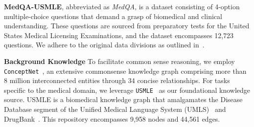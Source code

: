 \documentclass{article}
\theoremstyle{boldremark}
\begin{document}
\noindent \textbf{MedQA-USMLE}, abbreviated as \textit{MedQA}, is a dataset consisting of 4-option multiple-choice questions that demand a grasp of biomedical and clinical understanding. These questions are sourced from preparatory tests for the United States Medical Licensing Examinations, and the dataset encompasses 12,723 questions. We adhere to the original data divisions as outlined in~\cite{app11146421}.

\noindent \textbf{Background Knowledge}
To facilitate common sense reasoning, we employ \texttt{ConceptNet}~\cite{speer2017conceptnet}, an extensive commonsense knowledge graph comprising more than 8 million interconnected entities through 34 concise relationships. For tasks specific to the medical domain, we leverage \texttt{USMLE}~\cite{QA-GNN} as our foundational knowledge source. USMLE is a biomedical knowledge graph that amalgamates the Disease Database segment of the Uniﬁed Medical Language System (UMLS)~\cite{gkh061} and DrugBank~\cite{gkx1037}. This repository encompasses 9,958 nodes and 44,561 edges.
\end{document}
